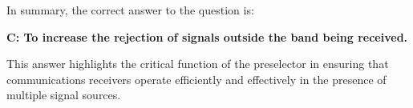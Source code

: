 


In summary, the correct answer to the question is:

\textbf{C: To increase the rejection of signals outside the band being received.} 

This answer highlights the critical function of the preselector in ensuring that communications receivers operate efficiently and effectively in the presence of multiple signal sources.